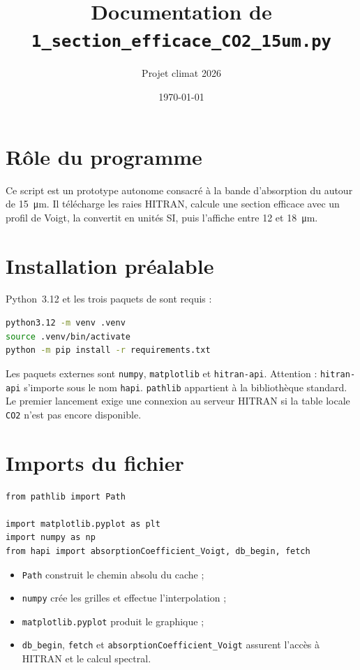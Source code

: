 \documentclass[11pt,a4paper]{article}
\title{Documentation de \texttt{1\_section\_efficace\_CO2\_15um.py}}
\author{Projet climat 2026}
\date{\today}
\begin{document}
\maketitle
\tableofcontents

\section{Rôle du programme}

Ce script est un prototype autonome consacré à la bande d'absorption du
 autour de \SI{15}{\micro\metre}. Il télécharge les raies HITRAN,
calcule une section efficace avec un profil de Voigt, la convertit en unités
SI, puis l'affiche entre 12 et \SI{18}{\micro\metre}.

\section{Installation préalable}

Python~3.12 et les trois paquets de  sont requis :

\begin{lstlisting}[language=bash]
python3.12 -m venv .venv
source .venv/bin/activate
python -m pip install -r requirements.txt
\end{lstlisting}

Les paquets externes sont \texttt{numpy}, \texttt{matplotlib} et
\texttt{hitran-api}. Attention : \texttt{hitran-api} s'importe sous le nom
\texttt{hapi}. \texttt{pathlib} appartient à la bibliothèque standard.
Le premier lancement exige une connexion au serveur HITRAN si la table locale
\texttt{CO2} n'est pas encore disponible.

\section{Imports du fichier}

\begin{lstlisting}
from pathlib import Path

import matplotlib.pyplot as plt
import numpy as np
from hapi import absorptionCoefficient_Voigt, db_begin, fetch
\end{lstlisting}

\begin{itemize}
  \item \texttt{Path} construit le chemin absolu du cache ;
  \item \texttt{numpy} crée les grilles et effectue l'interpolation ;
  \item \texttt{matplotlib.pyplot} produit le graphique ;
  \item \texttt{db\_begin}, \texttt{fetch} et
        \texttt{absorptionCoefficient\_Voigt} assurent l'accès à HITRAN et
        le calcul spectral.
\end{itemize}
\end{document}
